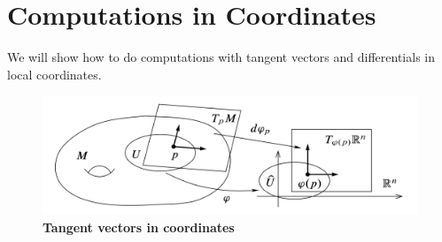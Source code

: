 \documentclass[11pt]{article}
\begin{document}
\section{Computations in Coordinates}
We will show how to do computations with tangent vectors and differentials in local coordinates.

\begin{figure}
\begin{minipage}[t]{1\linewidth}
  \centering
  \centerline{\includegraphics[scale = 0.6]{tangent_vec_coordinates.png}}
\end{minipage}
\caption{\footnotesize{\textbf{Tangent vectors in coordinates \citep{lee2003introduction}}}}
\label{fig: tangent_vec_coordinates}
\end{figure}
\end{document}
